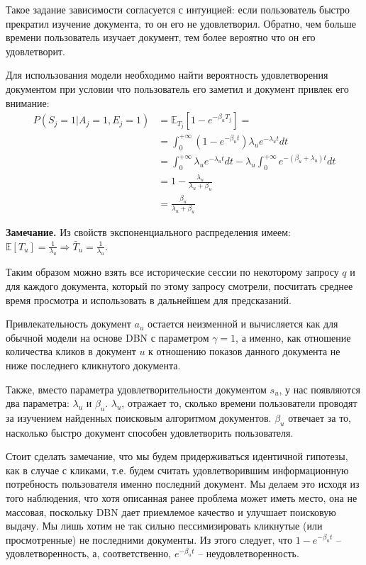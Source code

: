 \documentclass[diploma]{nanolab2015}
\begin{document}
Такое задание зависимости согласуется с интуицией: если пользователь быстро прекратил изучение документа, то он его не удовлетворил. Обратно, чем больше времени пользователь изучает документ, тем более вероятно что он его удовлетворит.

Для использования модели необходимо найти вероятность удовлетворения документом при условии что пользователь его заметил и документ привлек его внимание:
\begin{align*}
    P(S_j = 1 | A_j = 1, E_j = 1) & = \mathbb{E}_{T_j}[1 - e^{-\beta_u T_j}] = \\
                                  & = \int_{0}^{+\infty} (1 - e^{-\beta_u t}) \lambda_u e^{-\lambda_u t} dt \\
                                  & = \int_{0}^{+\infty} \lambda_u e^{-\lambda_u t} dt - \lambda_u \int_{0}^{+\infty} e^{-(\beta_u + \lambda_u) t} dt \\
                                  & = 1 - \frac{\lambda_u}{\lambda_u + \beta_u} \\
                                  & = \frac{\beta_u}{\lambda_u + \beta_u}
\end{align*}

\textbf{Замечание.} Из свойств экспоненциального распределения имеем: $\mathbb{E}[T_u] = \frac{1}{\lambda_u} \Rightarrow \bar{T}_u = \frac{1}{\lambda_u}$.

Таким образом можно взять все исторические сессии по некоторому запросу $q$ и для каждого документа, который по этому запросу смотрели, посчитать среднее время просмотра и использовать в дальнейшем для предсказаний.

Привлекательность документ $a_u$ остается неизменной и вычисляется как для обычной модели на основе DBN с параметром $\gamma = 1$, а именно, как отношение количества кликов в документ $u$ к отношению показов данного документа не ниже последнего кликнутого документа.

Также, вместо параметра удовлетворительности документом $s_u$, у нас появляются два параметра: $\lambda_u$ и $\beta_u$. $\lambda_u$, отражает то, сколько времени пользователи проводят за изучением найденных поисковым алгоритмом документов. $\beta_u$ отвечает за то, насколько быстро документ способен удовлетворить пользователя.

Стоит сделать замечание, что мы будем придерживаться идентичной гипотезы, как в случае с кликами, т.е. будем считать удовлетворившим информационную потребность пользователя именно последний документ. Мы делаем это исходя из того наблюдения, что хотя описанная ранее проблема может иметь место, она не массовая, поскольку DBN дает приемлемое качество и улучшает поисковую выдачу. Мы лишь хотим не так сильно пессимизировать кликнутые (или просмотренные) не последними документы. Из этого следует, что $1 - e^{-\beta_u t}$ -- удовлетворенность, а, соответственно, $e^{-\beta_u t}$ -- неудовлетворенность.
\end{document}
